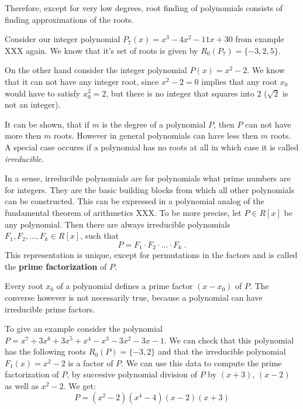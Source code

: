 Therefore, except for very low degrees, root finding of polynomials consists of finding approximations of the roots.
\begin{example}
Consider our integer polynomial $P_7(x)=x^3 - 4 x^2 - 11 x + 30$ from example XXX again. We know that it's set of roots is given by $R_0(P_7)=\{-3,2,5\}$.

On the other hand consider the integer polynomial $P(x)=x^2-2$. We know that it can not have any integer root, since $x^2-2=0$ implies that any root $x_0$ would have to satisfy $x_0^2=2$, but there is no integer that squares into $2$ ($\sqrt{2}$ is not an integer).
\end{example}
It can be shown, that if $m$ is the degree of a polynomial $P$, then $P$ can not have more then $m$ roots. However in general polynomials can have less then $m$ roots. A special case occures if a polynomial has no roots at all in which case it is called \textit{irreducible}. 

In a sense, irreducible polynomials are for polynomials what prime numbers are for integers. They are the basic building blocks from which all other polynomials can be constructed. This can be expressed in a polynomial analog of the fundamental theorem of arithmetics XXX. To be more precise, let $P \in R[x]$ be any polynomial. Then there are always irreducible polynomials $F_1, F_2, \ldots, F_k \in R[x]$, such that
\begin{equation}
P = F_1 \cdot F_2 \cdot \ldots \cdot F_k \;.
\end{equation}
This representation is unique, except for permutations in the factors and is called the \textbf{prime factorization} of $P$.

Every root $x_0$ of a polynomial defines a prime factor $(x-x_0)$ of $P$. The converse however is not necessarily true, because a polynomial can have irreducible prime factors. 
\begin{example} To give an example consider the polynomial 
$P=x^7 + 3 x^6 + 3 x^5 + x^4 - x^3 - 3 x^2 - 3 x - 1$. We can check that this polynomial has the following roots $R_0(P)=\{-3,2\}$ and that the irreducible polynomial $F_1(x)=x^2-2$ is a factor of $P$. We can use this data to compute the prime factorization of $P$, by succesive polynomial division of $P$ by $(x+3)$, $(x-2)$ as well as $x^2-2$. We get:
$$
P= (x^2-2)(x^4-4)(x-2)(x+3)
$$
\end{example}






